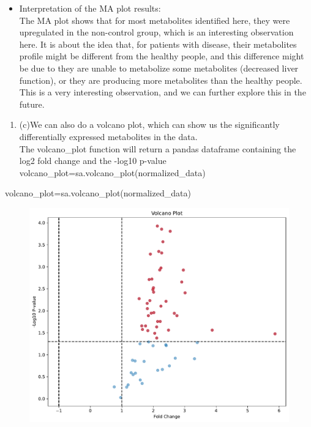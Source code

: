 \documentclass[
  letterpaper,
  DIV=11,
  numbers=noendperiod]{scrartcl}
\newenvironment{Shaded}{\begin{snugshade}}{\end{snugshade}}
\newcommand{\NormalTok}[1]{\textcolor[rgb]{0.00,0.23,0.31}{#1}}
\newcommand{\OperatorTok}[1]{\textcolor[rgb]{0.37,0.37,0.37}{#1}}
\providecommand{\tightlist}{%
  \setlength{\itemsep}{0pt}\setlength{\parskip}{0pt}}\usepackage{longtable,booktabs,array}
\begin{document}
\begin{itemize}
\tightlist
\item
  Interpretation of the MA plot results:\\
  The MA plot shows that for most metabolites identified here, they were
  upregulated in the non-control group, which is an interesting
  observation here. It is about the idea that, for patients with
  disease, their metabolites profile might be different from the healthy
  people, and this difference might be due to they are unable to
  metabolize some metabolites (decreased liver function), or they are
  producing more metabolites than the healthy people. This is a very
  interesting observation, and we can further explore this in the
  future.\\
\end{itemize}

\begin{enumerate}
\def\labelenumi{\arabic{enumi}.}
\setcounter{enumi}{2}
\tightlist
\item
  (c)We can also do a volcano plot, which can show us the significantly
  differentially expressed metabolites in the data.\\
  The volcano\_plot function will return a pandas dataframe containing
  the log2 fold change and the -log10 p-value
  volcano\_plot=sa.volcano\_plot(normalized\_data)
\end{enumerate}

\begin{Shaded}
\begin{Highlighting}[]
\NormalTok{volcano\_plot}\OperatorTok{=}\NormalTok{sa.volcano\_plot(normalized\_data)}
\end{Highlighting}
\end{Shaded}

\begin{figure}[H]

{\centering \includegraphics{tutorial_files/figure-pdf/perform_volcano_plot-output-1.pdf}

}

\end{figure}
\end{document}
